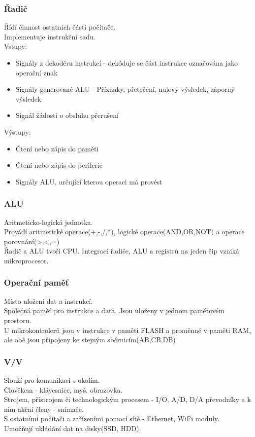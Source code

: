 \subsubsection*{Řadič}
Řídí činnost ostatních částí počítače. \\
Implementuje instrukční sadu. \\
Vstupy:\\
\begin{itemize}
    \item Signály z dekodéru instrukcí - dekóduje se část instrukce označována jako operační znak
    \item Signály generované ALU - Příznaky, přetečení, nulový výsledek, záporný výsledek
    \item Signál žádosti o obsluhu přerušení
\end{itemize}
Výstupy:\\
\begin{itemize}
    \item Čtení nebo zápis do paměti
    \item Čtení nebo zápis do periferie
    \item Signály ALU, určující kterou operaci má provést
\end{itemize}

\subsubsection*{ALU}
Aritmeticko-logická jednotka.\\
Provádí aritmetické operace(+,-,/,*), logické operace(AND,OR,NOT) a operace porovnání(>,<,=)\\
Řadič a ALU tvoří CPU. Integrací řadiče, ALU a registrů na jeden čip vzniká mikroprocesor.

\subsubsection*{Operační paměť}
Místo uložení dat a instrukcí.\\
Společná paměť pro instrukce a data. Jsou uloženy v jednom paměťovém prostoru.\\
U mikrokontrolerů jsou v instrukce v paměti FLASH a proměnné v paměti RAM, ale obě jsou připojeny ke stejným sběrnicím(AB,CB,DB)

\subsubsection*{V/V}
Slouží pro komunikaci s okolím.\\
Člověkem - klávesnice, myš, obrazovka. \\
Strojem, přístrojem či technologickým procesem - I/O, A/D, D/A převodníky a k nim akční členy - snímače. \\
S ostatními počítači a zařízeními pomocí sítě - Ethernet, WiFi moduly. \\
Umožňují ukládání dat na disky(SSD, HDD). \\

